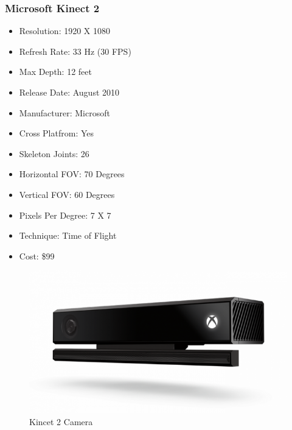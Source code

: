 \documentclass[a4paper,10pt]{article}
\begin{document}
	\subsubsection{Microsoft Kinect 2}
\begin{itemize}
  \item Resolution: 1920 X 1080
  \item Refresh Rate: 33 Hz (30 FPS)
  \item Max Depth: 12 feet
  \item Release Date: August 2010 
  \item Manufacturer: Microsoft
  \item Cross Platfrom: Yes
  \item Skeleton Joints: 26
  \item Horizontal FOV: 70 Degrees
  \item Vertical FOV: 60 Degrees
  \item Pixels Per Degree: 7 X 7
  \item Technique: Time of Flight
  \item Cost: \$99
\end{itemize}
\begin{figure}[H]
	\includegraphics[width=\linewidth,height=\paperheight,keepaspectratio]{kinect2.jpg}
	\caption{Kincet 2 Camera}
	\label{fig:k2Cam}
	\end{figure}
	\pagebreak
	
\end{document}
